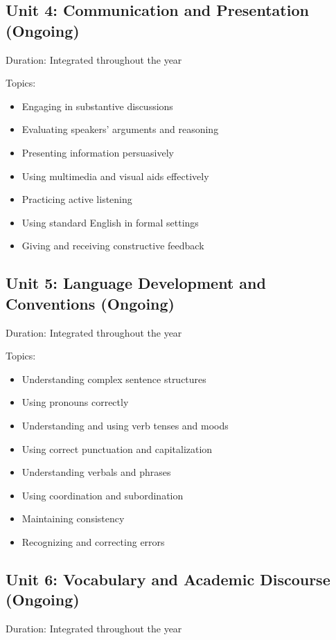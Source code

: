 \documentclass[11pt,letterpaper]{report}
\begin{document}
\subsection{Unit 4: Communication and Presentation (Ongoing)}

Duration: Integrated throughout the year

Topics:
\begin{itemize}
\item Engaging in substantive discussions
\item Evaluating speakers' arguments and reasoning
\item Presenting information persuasively
\item Using multimedia and visual aids effectively
\item Practicing active listening
\item Using standard English in formal settings
\item Giving and receiving constructive feedback
\end{itemize}

\subsection{Unit 5: Language Development and Conventions (Ongoing)}

Duration: Integrated throughout the year

Topics:
\begin{itemize}
\item Understanding complex sentence structures
\item Using pronouns correctly
\item Understanding and using verb tenses and moods
\item Using correct punctuation and capitalization
\item Understanding verbals and phrases
\item Using coordination and subordination
\item Maintaining consistency
\item Recognizing and correcting errors
\end{itemize}

\subsection{Unit 6: Vocabulary and Academic Discourse (Ongoing)}

Duration: Integrated throughout the year
\end{document}
